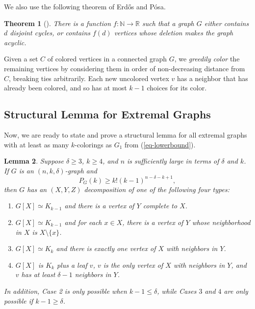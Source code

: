 \documentclass[11pt]{article}
\theoremstyle{plain}
\newtheorem{theorem}{Theorem}[section]
\newtheorem{lemma}[theorem]{Lemma}
\theoremstyle{definition}
\theoremstyle{remark}
\begin{document}
We also use the following theorem of Erd\H{o}s and P\'osa. 
\begin{theorem}[\cite{ErdosPosa}]\label{thm-EP}
There is a function $f:\mathbb{N} \to \mathbb{R}$ such that a graph $G$ either contains $d$ disjoint cycles, or contains $f(d)$ vertices whose deletion makes the graph acyclic.
\end{theorem}

Given a set $C$ of colored vertices in a connected graph $G$, we {\em greedily color} the remaining vertices by considering them in order of non-decreasing distance from $C$, breaking ties arbitrarily. Each new uncolored vertex $v$ has a neighbor that has already been colored, and so has at most $k-1$ choices for its color.

\subsection{Structural Lemma for Extremal Graphs}

Now, we are ready to state and prove a structural lemma for all extremal graphs with at least as many $k$-colorings as $G_1$ from (\ref{eq-lowerbound}).

\begin{lemma}\label{lem-extremal}
Suppose $\delta \ge 3$, $k\ge 4$, and $n$ is sufficiently large in terms of $\delta$ and $k$. If $G$ is an $(n,k,\delta)$-graph and
\begin{equation}\label{eq-extremal}
P_G(k) \ge k! (k-1)^{n-\delta-k+1},
\end{equation}
then $G$ has an $(X,Y,Z)$ decomposition of one of the following four types:
\begin{enumerate}
    \item $G[X]\simeq K_{k-1}$ and there is a vertex of $Y$ complete to $X$.
    \item $G[X]\simeq K_{k-1}$ and for each $x\in X$, there is a vertex of $Y$ whose neighborhood in $X$ is $X\setminus \{x\}$.
    \item $G[X]\simeq K_k$ and there is exactly one vertex of $X$ with neighbors in $Y$.
    \item $G[X]$ is $K_k$ plus a leaf $v$, $v$ is the only vertex of $X$ with neighbors in $Y$, and $v$ has at least $\delta -1$ neighbors in $Y$.
\end{enumerate}
In addition, Case 2 is only possible when $k - 1 \le \delta$, while Cases $3$ and $4$ are only possible if $k-1 \ge \delta$.
\end{lemma}
\end{document}
